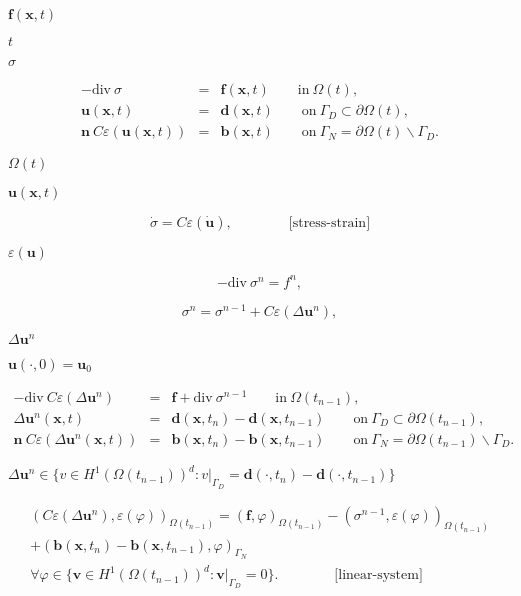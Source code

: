 \documentclass{article}
\begin{document}
$\mathbf{f}(\mathbf{x},t)$
\pagebreak

$t$
\pagebreak

$\sigma$
\pagebreak

\begin{eqnarray*} - \textrm{div}\ \sigma &=& \mathbf{f}(\mathbf{x},t) \qquad \textrm{in}\ \Omega(t), \\ \mathbf{u}(\mathbf{x},t) &=& \mathbf{d}(\mathbf{x},t) \qquad \textrm{on}\ \Gamma_D\subset\partial\Omega(t), \\ \mathbf{n} \ C \varepsilon(\mathbf{u}(\mathbf{x},t)) &=& \mathbf{b}(\mathbf{x},t) \qquad \textrm{on}\ \Gamma_N=\partial\Omega(t)\backslash\Gamma_D. \end{eqnarray*}
\pagebreak

$\Omega(t)$
\pagebreak

$\mathbf{u}(\mathbf{x},t)$
\pagebreak

\[ \dot\sigma = C \varepsilon (\dot{\mathbf{u}}), \qquad \qquad \textrm{[stress-strain]} \]
\pagebreak

$\varepsilon(\mathbf{u})$
\pagebreak

\[ -\textrm{div}\ \sigma^n = f^n, \]
\pagebreak

\[ \sigma^n = \sigma^{n-1} + C \varepsilon (\Delta \mathbf{u}^n), \]
\pagebreak

$\Delta \mathbf{u}^n$
\pagebreak

$\mathbf{u}(\cdot,0)=\mathbf{u}_0$
\pagebreak

\begin{eqnarray*} - \textrm{div}\ C \varepsilon(\Delta\mathbf{u}^n) &=& \mathbf{f} + \textrm{div}\ \sigma^{n-1} \qquad \textrm{in}\ \Omega(t_{n-1}), \\ \Delta \mathbf{u}^n(\mathbf{x},t) &=& \mathbf{d}(\mathbf{x},t_n) - \mathbf{d}(\mathbf{x},t_{n-1}) \qquad \textrm{on}\ \Gamma_D\subset\partial\Omega(t_{n-1}), \\ \mathbf{n} \ C \varepsilon(\Delta \mathbf{u}^n(\mathbf{x},t)) &=& \mathbf{b}(\mathbf{x},t_n)-\mathbf{b}(\mathbf{x},t_{n-1}) \qquad \textrm{on}\ \Gamma_N=\partial\Omega(t_{n-1})\backslash\Gamma_D. \end{eqnarray*}
\pagebreak

$\Delta \mathbf{u}^n \in \{v\in H^1(\Omega(t_{n-1}))^d: v|_{\Gamma_D}=\mathbf{d}(\cdot,t_n) - \mathbf{d}(\cdot,t_{n-1})\}$
\pagebreak

\begin{eqnarray*} (C \varepsilon(\Delta\mathbf{u}^n), \varepsilon(\varphi) )_{\Omega(t_{n-1})} = (\mathbf{f}, \varphi)_{\Omega(t_{n-1})} -(\sigma^{n-1},\varepsilon(\varphi))_{\Omega(t_{n-1})} \\ +(\mathbf{b}(\mathbf{x},t_n)-\mathbf{b}(\mathbf{x},t_{n-1}), \varphi)_{\Gamma_N} \\ \forall \varphi \in \{\mathbf{v}\in H^1(\Omega(t_{n-1}))^d: \mathbf{v}|_{\Gamma_D}=0\}. \qquad \qquad \textrm{[linear-system]} \end{eqnarray*}
\pagebreak
\end{document}
